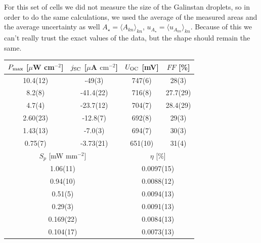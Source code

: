 \documentclass[a4paper,10pt,twocolumn]{article}
\begin{document}
\begin{extract*}
For this set of cells we did not measure the size of the Galinstan droplets, so in order to do the same calculations, we used the average of the measured areas and the average uncertainty as well $A_\star = \langle A_{kn} \rangle_{kn}$, $u_{A_\star} = \langle u_{A_{kn}}  \rangle_{kn}$. Because of this we can't really trust the exact values of the data, but the shape should remain the same.
\begin{table}[]
	\begin{tabular}{@{}cccc@{}}
		\toprule
		$P_{\text{max}}$ [$\mu$W cm$^{-2}$] & $j_{\text{SC}}$ [$\mu$A $\mathrm{cm}^{-2}$] & $U_{\text{OC}}$ [mV]          & $FF$ [\%]         \\ \midrule
		10.4(12)                   & -49(3)                             & 747(6)               & 28(3)             \\
		8.2(8)                     & -41.4(22)                          & 716(8)               & 27.7(29)          \\
		4.7(4)                     & -23.7(12)                          & 704(7)               & 28.4(29)          \\
		2.60(23)                   & -12.8(7)                           & 692(8)               & 29(3)             \\
		1.43(13)                   & -7.0(3)                            & 694(7)               & 30(3)             \\
		0.75(7)                    & -3.73(21)                          & 651(10)              & 31(4)             \\ \midrule
		\multicolumn{2}{c}{$S_p$ [mW mm$^{-2}$]}                        & \multicolumn{2}{c}{$\eta$ [\%]} \\ \midrule
		\multicolumn{2}{c}{1.06(11)}                                    & \multicolumn{2}{c}{0.0097(15)}           \\
		\multicolumn{2}{c}{0.94(10)}                                    & \multicolumn{2}{c}{0.0088(12)}           \\
		\multicolumn{2}{c}{0.51(5)}                                     & \multicolumn{2}{c}{0.0094(13)}           \\
		\multicolumn{2}{c}{0.29(3)}                                     & \multicolumn{2}{c}{0.0091(13)}           \\
		\multicolumn{2}{c}{0.169(22)}                                   & \multicolumn{2}{c}{0.0084(13)}           \\
		\multicolumn{2}{c}{0.104(17)}                                   & \multicolumn{2}{c}{0.0073(13)}           \\ \bottomrule
	\end{tabular}
\end{table}



\end{extract*}
\end{document}

